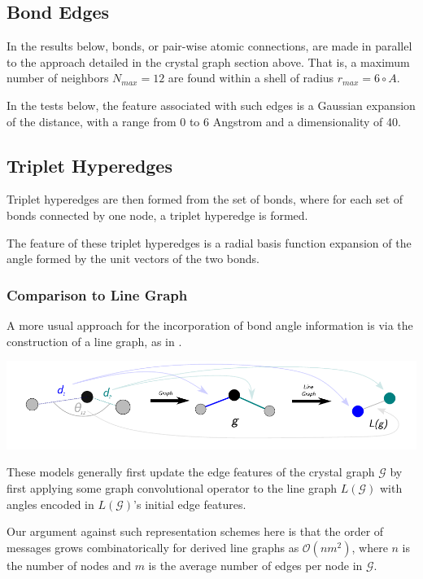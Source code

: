 \documentclass[10pt,a4paper]{article}
\begin{document}
\subsection{Bond Edges}
In the results below, bonds, or pair-wise atomic connections, are made in parallel to the approach detailed in the crystal graph section above. That is, a maximum number of neighbors $N_{max}=12$ are found within a shell of radius $r_{max}=6\circ{A}$. 

In the tests below, the feature associated with such edges is a Gaussian expansion of the distance, with a range from 0 to 6 Angstrom and a dimensionality of 40.

\subsection{Triplet Hyperedges}
Triplet hyperedges are then formed from the set of bonds, where for each set of bonds connected by one node, a triplet hyperedge is formed.

The feature of these triplet hyperedges is a radial basis function expansion of the angle formed by the unit vectors of the two bonds.

\subsubsection{Comparison to Line Graph}
A more usual approach for the incorporation of bond angle information is via the construction of a line graph, as in \cite{alignn, m3gnet}. 
\begin{center}
\includegraphics[scale=0.7]{line_graph_ex.pdf}
\end{center}
These models generally first update the edge features of the crystal graph $\mathcal{G}$ by first applying some graph convolutional operator to the line graph $L(\mathcal{G})$ with angles encoded in  $L(\mathcal{G})$'s initial edge features.

Our argument against such representation schemes here is that the order of messages grows combinatorically for derived line graphs as $\mathcal{O}(nm^2)$, where $n$ is the number of nodes and $m$ is the average number of edges per node in $\mathcal{G}$.
\end{document}
